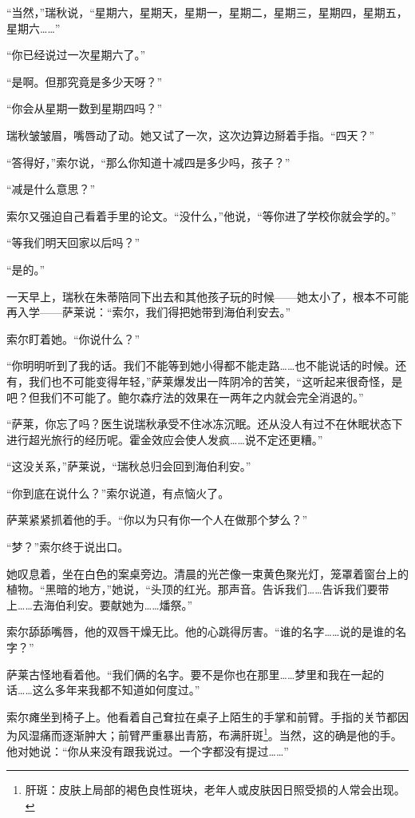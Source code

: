 \documentclass[AutoFakeBold=true]{book}
\begin{document}
``当然，''瑞秋说，``星期六，星期天，星期一，星期二，星期三，星期四，星期五，星期六……''

``你已经说过一次星期六了。''

``是啊。但那究竟是多少天呀？''

``你会从星期一数到星期四吗？''

瑞秋皱皱眉，嘴唇动了动。她又试了一次，这次边算边掰着手指。``四天？''

``答得好，''索尔说，``那么你知道十减四是多少吗，孩子？''

``减是什么意思？''

索尔又强迫自己看着手里的论文。``没什么，''他说，``等你进了学校你就会学的。''

``等我们明天回家以后吗？''

``是的。''

\vspace*{1em}

一天早上，瑞秋在朱蒂陪同下出去和其他孩子玩的时候——她太小了，根本不可能再入学——萨莱说：``索尔，我们得把她带到海伯利安去。''

索尔盯着她。``你说什么？''

``你明明听到了我的话。我们不能等到她小得都不能走路……也不能说话的时候。还有，我们也不可能变得年轻，''萨莱爆发出一阵阴冷的苦笑，``这听起来很奇怪，是吧？但我们不可能了。鲍尔森疗法的效果在一两年之内就会完全消退的。''

``萨莱，你忘了吗？医生说瑞秋承受不住冰冻沉眠。还从没人有过不在休眠状态下进行超光旅行的经历呢。霍金效应会使人发疯……说不定还更糟。''

``这没关系，''萨莱说，``瑞秋总归会回到海伯利安。''

``你到底在说什么？''索尔说道，有点恼火了。

萨莱紧紧抓着他的手。``你以为只有你一个人在做那个梦么？''

``梦？''索尔终于说出口。

她叹息着，坐在白色的案桌旁边。清晨的光芒像一束黄色聚光灯，笼罩着窗台上的植物。``黑暗的地方，''她说，``头顶的红光。那声音。告诉我们……告诉我们要带上……去海伯利安。要献她为……燔祭。''

索尔舔舔嘴唇，他的双唇干燥无比。他的心跳得厉害。``谁的名字……说的是谁的名字？''

萨莱古怪地看着他。``我们俩的名字。要不是你也在那里……梦里和我在一起的话……这么多年来我都不知道如何度过。''

索尔瘫坐到椅子上。他看着自己耷拉在桌子上陌生的手掌和前臂。手指的关节都因为风湿痛而逐渐肿大；前臂严重暴出青筋，布满肝斑\footnote{肝斑：皮肤上局部的褐色良性斑块，老年人或皮肤因日照受损的人常会出现。}。当然，这的确是他的手。他对她说：``你从来没有跟我说过。一个字都没有提过……''
\end{document}
